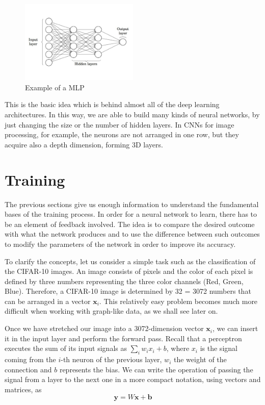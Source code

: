 \documentclass[12pt,a4paper]{report}
\theoremstyle{definition}
\begin{document}
\begin{figure}
    \centering
    \includegraphics[trim={0 2.7cm 0 2.7cm}, clip, width=0.5\textwidth]{./Images/Multi_Layer_Perceptron.pdf}
    \caption{Example of a MLP}
    \label{fig:MLP}
\end{figure}

This is the basic idea which is behind almost all of the deep learning architectures.
In this way, we are able to build many kinds of neural networks, by just changing the size or the number of hidden layers.
In CNNs for image processing, for example, the neurons are not arranged in one row, but they acquire also a depth dimension, forming 3D layers.

\section{Training}
\label{sec:training}

The previous sections give us enough information to understand the fundamental bases of the training process.
In order for a neural network to learn, there has to be an element of feedback involved.
The idea is to compare the desired outcome with what the network produces and to use the difference between such outcomes to modify the parameters of the network in order to improve its accuracy.

To clarify the concepts, let us consider a simple task such as the classification of the CIFAR-10 images.
An image consists of pixels and the color of each pixel is defined by three numbers representing the three color channels (Red, Green, Blue).
Therefore, a CIFAR-10 image is determined by 32 = 3072 numbers that can be arranged in a vector $\textbf{x}_i$.
This relatively easy problem becomes much more difficult when working with graph-like data, as we shall see later on.

Once we have stretched our image into a 3072-dimension vector $\textbf{x}_i$, we can insert it in the input layer and perform the forward pass.
Recall that a perceptron executes the sum of its input signals as $\sum_i w_i x_i + b$, where $x_i$ is the signal coming from the $i$-th neuron of the previous layer, $w_i$ the weight of the connection and $b$ represents the bias.
We can write the operation of passing the signal from a layer to the next one in a more compact notation, using vectors and matrices, as
\begin{equation}
    \textbf{y} = W \textbf{x} + \textbf{b}
    \label{eq:forward}
\end{equation}
\end{document}
